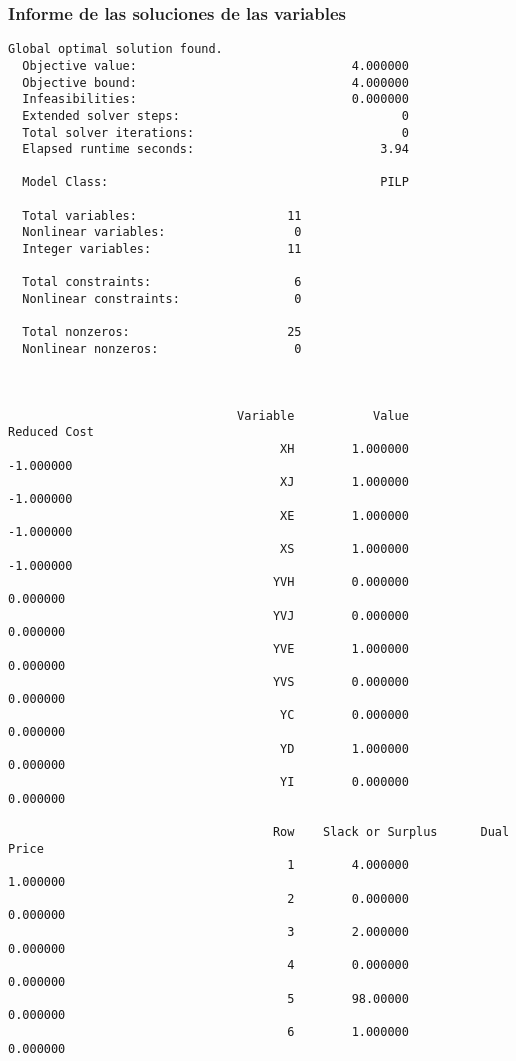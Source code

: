 \documentclass[10pt, a4paper, titlepage,
	oneside,
	fleqn, leqno]{article}
\begin{document}
\subsubsection{Informe de las soluciones de las variables}
\begin{lstlisting}
Global optimal solution found.
  Objective value:                              4.000000
  Objective bound:                              4.000000
  Infeasibilities:                              0.000000
  Extended solver steps:                               0
  Total solver iterations:                             0
  Elapsed runtime seconds:                          3.94

  Model Class:                                      PILP

  Total variables:                     11
  Nonlinear variables:                  0
  Integer variables:                   11

  Total constraints:                    6
  Nonlinear constraints:                0

  Total nonzeros:                      25
  Nonlinear nonzeros:                   0



                                Variable           Value        Reduced Cost
                                      XH        1.000000           -1.000000
                                      XJ        1.000000           -1.000000
                                      XE        1.000000           -1.000000
                                      XS        1.000000           -1.000000
                                     YVH        0.000000            0.000000
                                     YVJ        0.000000            0.000000
                                     YVE        1.000000            0.000000
                                     YVS        0.000000            0.000000
                                      YC        0.000000            0.000000
                                      YD        1.000000            0.000000
                                      YI        0.000000            0.000000

                                     Row    Slack or Surplus      Dual Price
                                       1        4.000000            1.000000
                                       2        0.000000            0.000000
                                       3        2.000000            0.000000
                                       4        0.000000            0.000000
                                       5        98.00000            0.000000
                                       6        1.000000            0.000000

\end{lstlisting}
\end{document}
